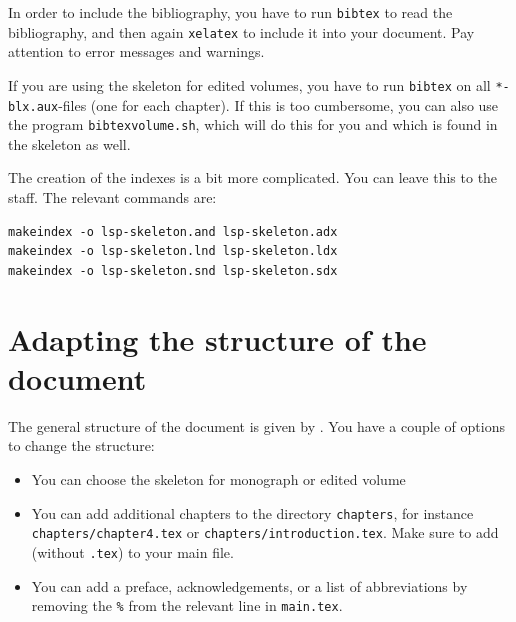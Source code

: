 In order to include the bibliography, you have to run \verb+bibtex+ to read the bibliography, and then again \verb+xelatex+ to include it into your document. Pay attention to error messages and warnings.
 
If you are using the skeleton for edited volumes, you have to run  \verb+bibtex+ on all \verb+*-blx.aux+-files (one for each chapter). If this is too cumbersome, you can also use the program \verb+bibtexvolume.sh+, which will do this for you and which is found in the skeleton as well. 

The creation of the indexes is a bit more complicated. You can leave this to the \lsp staff. The relevant commands are:

\begin{verbatim}
makeindex -o lsp-skeleton.and lsp-skeleton.adx
makeindex -o lsp-skeleton.lnd lsp-skeleton.ldx 
makeindex -o lsp-skeleton.snd lsp-skeleton.sdx
\end{verbatim} 


\section{Adapting the structure of the document}
The general structure of the document is given by \lsp. You have a couple of options to change the structure:
\begin{itemize}
 \item You can choose the skeleton for monograph or edited volume
 \item You can add additional chapters to the directory \verb+chapters+, for instance\\ \verb+chapters/chapter4.tex+ or \verb+chapters/introduction.tex+. Make sure to add \verb++ (without \verb+.tex+) to your main file.
 \item You can add a preface, acknowledgements, or a list of abbreviations by removing the \verb+%+ from the relevant line in \verb+main.tex+.
 \end{itemize}



